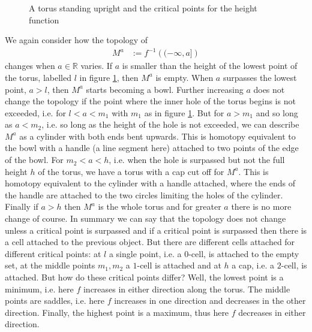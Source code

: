 \begin{figure}[h!]
\centering
{}
\caption{A torus standing upright and the critical points for the height function}
\label{fig:torus}
\end{figure}
We again consider how the topology of
\begin{align*}
  M^{a}
  &:=
  f^{-1}
  \left(
    (-\infty,a]
  \right)
\end{align*}
changes when $a \in \mathbb{R}$ varies. If $a$ is smaller than the height of the lowest point of the torus, labelled $l$ in figure \ref{fig:torus}, then $M^{a}$ is empty. When $a$ surpasses the lowest point, $a > l$, then $M^{a}$ starts becoming a bowl. Further increasing $a$ does not change the topology if the point where the inner hole of the torus begins is not exceeded, i.e. for $l < a < m_{1}$ with $m_{1}$ as in figure \ref{fig:torus}. But for $a > m_{1}$ and so long as $a < m_{2}$, i.e. so long as the height of the hole is not exceeded, we can describe $M^{a}$ as a cylinder with both ends bent upwards. This is homotopy equivalent to the bowl with a handle (a line segment here) attached to two points of the edge of the bowl. For $m_{2} < a < h$, i.e. when the hole is surpassed but not the full height $h$ of the torus, we have a torus with a cap cut off for $M^{a}$. This is homotopy equivalent to the cylinder with a handle attached, where the ends of the handle are attached to the two circles limiting the holes of the cylinder. Finally if $a > h$ then $M^{a}$ is the whole torus and for greater $a$ there is no more change of course. In summary we can say that the topology does not change unless a critical point is surpassed and if a critical point is surpassed then there is a cell attached to the previous object. But there are different cells attached for different critical points: at $l$ a single point, i.e. a $0$-cell, is attached to the empty set, at the middle points $m_{1},m_{2}$ a $1$-cell is attached and at $h$ a cap, i.e. a $2$-cell, is attached. But how do these critical points differ? Well, the lowest point is a minimum, i.e. here $f$ increases in either direction along the torus. The middle points are saddles, i.e. here $f$ increases in one direction and decreases in the other direction. Finally, the highest point is a maximum, thus here $f$ decreases in either direction.
